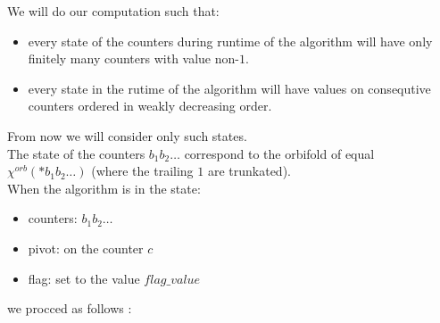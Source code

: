 We will do our computation such that:
\begin{itemize}
\item every state of the counters during runtime of the algorithm will have only finitely many 
counters with value non-$1$. 
\item every state in the rutime of the algorithm 
will have values on consequtive counters ordered in weakly decreasing order.
\end{itemize}
From now we will 
consider only such states. \\
The state of the counters $b_1b_2\dots$ correspond to the orbifold of 
\Eoc  equal $\chi^{orb}(*b_1b_2\dots)$ (where the trailing $1$ are trunkated). \\ 
When the algorithm is in the state: 
\begin{itemize}
\item counters: $b_1b_2\dots$
\item pivot: on the counter $c$
\item flag: set to the value $flag\_value$
\end{itemize}
we procced as follows 
:
